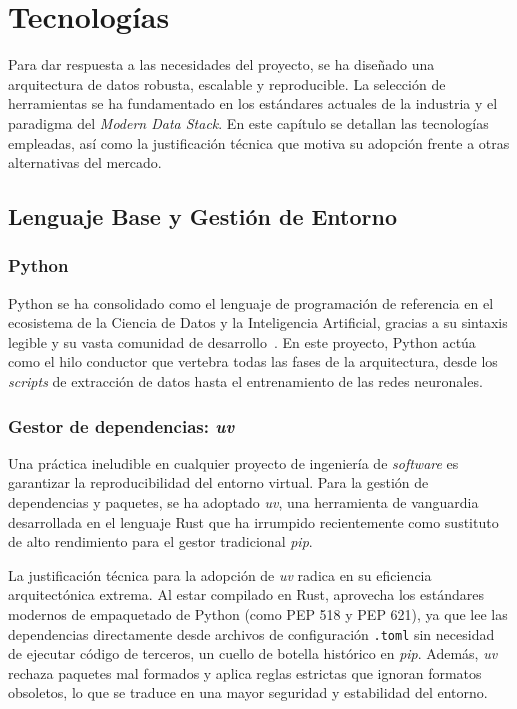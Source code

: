 \chapter{Tecnologías}
\label{chap:tecnologias}

Para dar respuesta a las necesidades del proyecto, se ha diseñado una arquitectura de datos robusta, escalable y reproducible. La selección de herramientas se ha fundamentado en los estándares actuales de la industria y el paradigma del \textit{Modern Data Stack}. En este capítulo se detallan las tecnologías empleadas, así como la justificación técnica que motiva su adopción frente a otras alternativas del mercado.





\section{Lenguaje Base y Gestión de Entorno}
\label{sec:entorno}

\subsection{Python\\}
\label{subsec:python}

Python se ha consolidado como el lenguaje de programación de referencia en el ecosistema de la Ciencia de Datos y la Inteligencia Artificial, gracias a su sintaxis legible y su vasta comunidad de desarrollo~\cite{van1995python}. En este proyecto, Python actúa como el hilo conductor que vertebra todas las fases de la arquitectura, desde los \textit{scripts} de extracción de datos hasta el entrenamiento de las redes neuronales.

\subsection{Gestor de dependencias: \textit{uv}}
\label{subsec:uv}

Una práctica ineludible en cualquier proyecto de ingeniería de \textit{software} es garantizar la reproducibilidad del entorno virtual. Para la gestión de dependencias y paquetes, se ha adoptado \textit{uv}, una herramienta de vanguardia desarrollada en el lenguaje Rust que ha irrumpido recientemente como sustituto de alto rendimiento para el gestor tradicional \textit{pip}.

La justificación técnica para la adopción de \textit{uv} radica en su eficiencia arquitectónica extrema. Al estar compilado en Rust, aprovecha los estándares modernos de empaquetado de Python (como PEP 518 y PEP 621), ya que lee las dependencias directamente desde archivos de configuración \texttt{.toml} sin necesidad de ejecutar código de terceros, un cuello de botella histórico en \textit{pip}. Además, \textit{uv} rechaza paquetes mal formados y aplica reglas estrictas que ignoran formatos obsoletos, lo que se traduce en una mayor seguridad y estabilidad del entorno.

